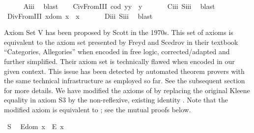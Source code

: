 \begin{isabellebody}
%
\isadelimproof
\ \ \ \ %
\endisadelimproof
%
\isatagproof
{}\isamarkupfalse%
\ A\isactrlsub i\isactrlsub i\isactrlsub i\ \isamarkupfalse%
\ blast%
\endisatagproof
{\isafoldproof}%
%
\isadelimproof
\isanewline
%
\endisadelimproof
\ \ \isamarkupfalse%
\ C\isactrlsub i\isactrlsub vFromIII{\isacharcolon}\ {\isachardoublequoteopen}{\isacharparenleft}cod\ y{\isacharparenright}{\isasymcdot}y\ {\isasymcong}\ y{\isachardoublequoteclose}\ \isanewline
%
\isadelimproof
\ \ \ \ %
\endisadelimproof
%
\isatagproof
{}\isamarkupfalse%
\ C\isactrlsub i\isactrlsub i\isactrlsub i\ S\isactrlsub i\isactrlsub i\isactrlsub i\ \isamarkupfalse%
\ blast%
\endisatagproof
{\isafoldproof}%
%
\isadelimproof
\isanewline
%
\endisadelimproof
\ \ \isamarkupfalse%
\ D\isactrlsub i\isactrlsub vFromIII{\isacharcolon}\ {\isachardoublequoteopen}x{\isasymcdot}{\isacharparenleft}dom\ x{\isacharparenright}\ {\isasymcong}\ x{\isachardoublequoteclose}\ \isanewline
%
\isadelimproof
\ \ \ \ %
\endisadelimproof
%
\isatagproof
{}\isamarkupfalse%
\ D\isactrlsub i\isactrlsub i\isactrlsub i\ S\isactrlsub i\isactrlsub i\isactrlsub i\ \isamarkupfalse%
\ blast%
\endisatagproof
{\isafoldproof}%
%
\isadelimproof
%
\endisadelimproof
%
\isamarkuptrue%
%
\begin{isamarkuptext}%
Axiom Set V has been proposed by Scott \cite{Scott79} in the 1970s. This set of
 axioms is equivalent to the axiom set presented by Freyd and Scedrov in their textbook
 ``Categories, Allegories'' \cite{FreydScedrov90} when encoded in free logic, corrected/adapted and further simplified. 
 Their axiom set is technically flawed when encoded in our given context. This issue has been detected by automated theorem provers
 with the same technical infrastructure as employed so far. See the subsequent section  
 for more details. 
 We have modified the axioms of \cite{FreydScedrov90} by replacing the original Kleene 
 equality \isa{{\isasymcong}} in axiom S3 by the
 non-reflexive, existing identity \isa{{\isasymsimeq}}. Note that the modified axiom  is equivalent to ;
 see the mutual proofs below.%
\end{isamarkuptext}\isamarkuptrue%
\ S{}{\isacharcolon}\ %
\ {\isachardoublequoteopen}E{\isacharparenleft}dom\ x{\isacharparenright}\ \isactrlbold {\isasymrightarrow}\ E\ x{\isachardoublequoteclose}\ \isanewline

\end{isabellebody}
